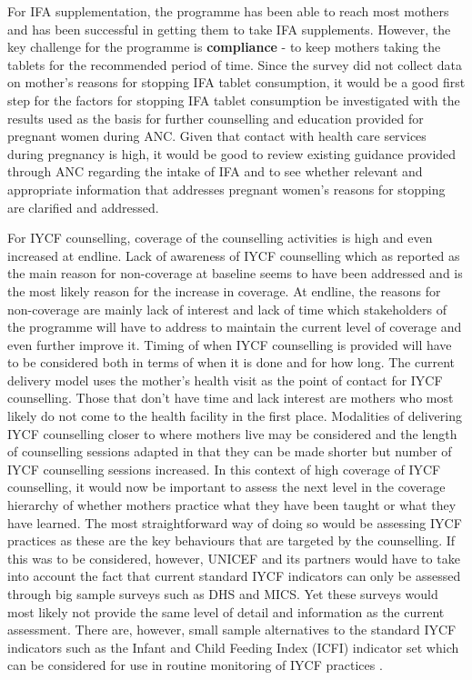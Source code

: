 \documentclass[12pt,a4paper]{article}
\begin{document}
For IFA supplementation, the programme has been able to reach most mothers and has been successful in getting them to take IFA supplements. However, the key challenge for the programme is \textbf{compliance} - to keep mothers taking the tablets for the recommended period of time. Since the survey did not collect data on mother's reasons for stopping IFA tablet consumption, it would be a good first step for the factors for stopping IFA tablet consumption be investigated with the results used as the basis for further counselling and education provided for pregnant women during ANC. Given that contact with health care services during pregnancy is high, it would be good to review existing guidance provided through ANC regarding the intake of IFA and to see whether relevant and appropriate information that addresses pregnant women's reasons for stopping are clarified and addressed.

For IYCF counselling, coverage of the counselling activities is high and even increased at endline. Lack of awareness of IYCF counselling which as reported as the main reason for non-coverage at baseline seems to have been addressed and is the most likely reason for the increase in coverage. At endline, the reasons for non-coverage are mainly lack of interest and lack of time which stakeholders of the programme will have to address to maintain the current level of coverage and even further improve it. Timing of when IYCF counselling is provided will have to be considered both in terms of when it is done and for how long. The current delivery model uses the mother's health visit as the point of contact for IYCF counselling. Those that don't have time and lack interest are mothers who most likely do not come to the health facility in the first place. Modalities of delivering IYCF counselling closer to where mothers live may be considered and the length of counselling sessions adapted in that they can be made shorter but number of IYCF counselling sessions increased. In this context of high coverage of IYCF counselling, it would now be important to assess the next level in the coverage hierarchy of whether mothers practice what they have been taught or what they have learned. The most straightforward way of doing so would be assessing IYCF practices as these are the key behaviours that are targeted by the counselling. If this was to be considered, however, UNICEF and its partners would have to take into account the fact that current standard IYCF indicators can only be assessed through big sample surveys such as DHS and MICS. Yet these surveys would most likely not provide the same level of detail and information as the current assessment. There are, however, small sample alternatives to the standard IYCF indicators such as the Infant and Child Feeding Index (ICFI) indicator set which can be considered for use in routine monitoring of IYCF practices \citep{Guevarra:2016uw}.
\end{document}
